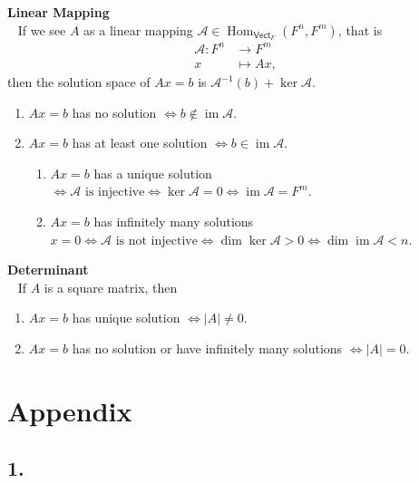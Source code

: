 \documentclass{report}
\theoremstyle{nonumberplain}
\begin{document}
\noindent\textbf{Linear Mapping}\\~
If we see $A$ as a linear mapping $\mathcal{A}\in\operatorname{Hom}_{\mathsf{Vect}_F}(F^n,F^m)$, that is
\begin{align*}
	\mathcal{A}:F^n&\longrightarrow F^m\\
	x&\longmapsto Ax,
\end{align*}
then the solution space of $Ax=b$ is $\mathcal{A}^{-1}(b)+\ker\mathcal{A}$.
\begin{enumerate}
	\item $Ax=b$ has no solution $\iff b\notin \operatorname{im}\mathcal{A}$.
	\item $Ax=b$ has at least one solution $\iff b\in \operatorname{im}\mathcal{A}$.
	\begin{enumerate}
		\item $Ax=b$ has a unique solution $\iff\mathcal{A}\text{ is injective}\iff\ker\mathcal{A}=0\iff \operatorname{im}\mathcal{A}=F^m$.
		\item $Ax=b$ has infinitely many solutions $x=0\iff\mathcal{A}\text{ is not injective}\iff\dim\ker\mathcal{A}>0\iff \dim\operatorname{im}\mathcal{A}<n$.
	\end{enumerate}
\end{enumerate}

\noindent\textbf{Determinant}\\~
If $A$ is a square matrix, then

\begin{enumerate}
	\item $Ax=b$ has unique solution $\iff \left|A\right|\ne 0$.
	\item $Ax=b$ has no  solution or have infinitely many solutions $\iff \left|A\right|=0$.
\end{enumerate}

\chapter*{Appendix}



\section*{1.}


\newpage

\end{document}
